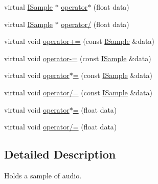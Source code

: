 \begin{DoxyCompactItemize}
\item 
virtual \hyperlink{classmaudio_1_1ISample}{I\-Sample} $\ast$ \hyperlink{classmaudio_1_1Sample_a3acd28e07a7fd552a54f6a0755493056}{operator$\ast$} (float data)
\item 
virtual \hyperlink{classmaudio_1_1ISample}{I\-Sample} $\ast$ \hyperlink{classmaudio_1_1Sample_ade7a0f4a21b0b78f082ee4c09c983d7c}{operator/} (float data)
\item 
virtual void \hyperlink{classmaudio_1_1Sample_aaaa4dcbd04db90aa9bdcf3f63665a9c7}{operator+=} (const \hyperlink{classmaudio_1_1ISample}{I\-Sample} \&data)
\item 
virtual void \hyperlink{classmaudio_1_1Sample_a2cf98ca0a69364efb1f9b3a083bacff5}{operator-\/=} (const \hyperlink{classmaudio_1_1ISample}{I\-Sample} \&data)
\item 
virtual void \hyperlink{classmaudio_1_1Sample_a48654599874e90747f0e2df36e8a5038}{operator$\ast$=} (const \hyperlink{classmaudio_1_1ISample}{I\-Sample} \&data)
\item 
virtual void \hyperlink{classmaudio_1_1Sample_aecb80004ebd611674563fe1c0aadb860}{operator/=} (const \hyperlink{classmaudio_1_1ISample}{I\-Sample} \&data)
\item 
virtual void \hyperlink{classmaudio_1_1Sample_a3ae8257702e07cc7af3424bbc04feede}{operator$\ast$=} (float data)
\item 
virtual void \hyperlink{classmaudio_1_1Sample_ac7b187b92806613e71bf4fccebf65bff}{operator/=} (float data)
\end{DoxyCompactItemize}


\subsection{Detailed Description}
Holds a sample of audio. 

